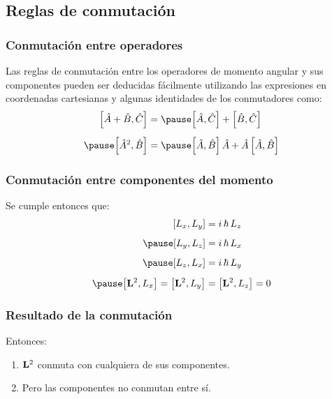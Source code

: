 \documentclass[12pt]{beamer}
\begin{document}

\subsection{Reglas de conmutación}

\begin{frame}
\frametitle{Conmutación entre operadores}
Las reglas de conmutación entre los operadores de momento angular y sus componentes pueden ser deducidas fácilmente utilizando las expresiones en coordenadas cartesianas y algunas identidades de los conmutadores como:
\pause
\begin{eqnarray*}
\begin{aligned}
\comm{\hat{A} + \hat{B}}{\hat{C}} &= \pause \comm{\hat{A}}{\hat{C}} + \comm{\hat{B}}{\hat{C}} \\[0.5em] \pause
\comm{\hat{A}^{2}}{\hat{B}} &= \pause \comm{\hat{A}}{\hat{B}} \, \hat{A} + \hat{A} \, \comm{\hat{A}}{\hat{B}}
\end{aligned}
\end{eqnarray*}
\end{frame}
\begin{frame}
\frametitle{Conmutación entre componentes del momento}
Se cumple entonces que:
\pause
\begin{eqnarray}
\begin{aligned}
\comm{L_{x}}{L_{y}} &= i \, \hbar \, L_{z} \\[0.5em] \pause
\comm{L_{y}}{L_{z}} &= i \, \hbar \, L_{x} \\[0.5em] \pause
\comm{L_{z}}{L_{x}} &= i \, \hbar \, L_{y} \\[0.5em] \pause
\comm{\vb{L}^{2}}{L_{x}} = \comm{\vb{L}^{2}}{L_{y}} &= \comm{\vb{L}^{2}}{L_{z}} = 0
\end{aligned}
\label{eq:ecuacion_01_07}
\end{eqnarray}
\end{frame}
\begin{frame}
\frametitle{Resultado de la conmutación}
Entonces: \pause
{}
\begin{enumerate}[<+->]
\item $\vb{L}^{2}$ conmuta con cualquiera de sus componentes.
\item Pero las componentes no conmutan entre sí.
\end{enumerate}
\end{frame}
\end{document}
